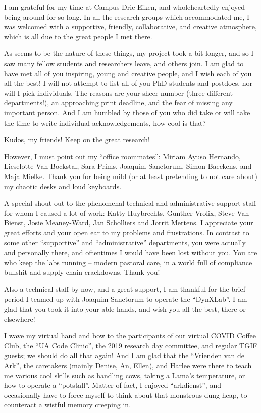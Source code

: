 I am grateful for my time at Campus Drie Eiken, and wholeheartedly enjoyed being around for so long.
In all the research groups which accommodated me, I was welcomed with a supportive, friendly, collaborative, and creative atmosphere, which is all due to the great people I met there.

\bigskip
As seems to be the nature of these things, my project took a bit longer, and so I saw many fellow students and researchers leave, and others join.
I am glad to have met all of you inspiring, young and creative people, and I wish each of you all the best!
I will not attempt to list all of you PhD students and postdocs, nor will I pick individuals.
The reasons are your sheer number (three different departments!), an approaching print deadline, and the fear of missing any important person.
And I am humbled by those of you who did take or will take the time to write individual acknowledgements, how cool is that?

Kudos, my friends! Keep on the great research!

\medskip
However, I must point out my ``office roommates'': Miriam Ayuso Hernando, Lieselotte Van Bockstal, Sara Prims, Joaquim Sanctorum, Simon Baeckens, and Maja Mielke.
Thank you for being mild (or at least pretending to not care about) my chaotic desks and loud keyboards.


\bigskip
A special shout-out to the phenomenal technical and administrative support staff for whom I caused a lot of work: Katty Huybrechts, Gunther Vrolix, Steve Van Bienst, Josie Meaney-Ward, Jan Scholliers and Jorrit Mertens.
I appreciate your great efforts and your open ear to my problems and frustrations.
In contrast to some other ``supportive'' and ``administrative'' departments, you were actually and personally there, and oftentimes I would have been lost without you.
You are who keep the labs running -- modern pastoral care, in a world full of compliance bullshit and supply chain crackdowns.
Thank you!

Also a technical staff by now, and a great support, I am thankful for the brief period I teamed up with Joaquim Sanctorum to operate the ``DynXLab''.
I am glad that you took it into your able hands, and wish you all the best, there or elsewhere!


\bigskip
I wave my virtual hand and bow to the participants of our virtual COVID Coffee Club, the ``UA Code Clinic'', the 2019 research day committee, and regular TGIF guests; we should do all that again!
And I am glad that the ``Vrienden van de Ark'', the caretakers (mainly Denise, An, Ellen), and Harlee were there to teach me various cool skills such as handling cows, taking a Lama's temperature, or how to operate a ``potstall''.
Matter of fact, I enjoyed ``arkdienst'', and occasionally have to force myself to think about that monstrous dung heap, to counteract a wistful memory creeping in.


